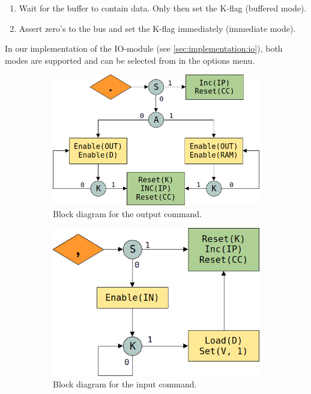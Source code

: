 \begin{enumerate}
\item Wait for the buffer to contain data. Only then set the K-flag (buffered mode).
\item Assert zero's to the bus and set the K-flag immediately (immediate mode).
\end{enumerate}
In our implementation of the IO-module (see \ref{sec:implementation:io}), both modes are supported and can be selected from in the options menu.

\begin{figure}[h]
  \centering
  \mbox{}\hfill
  \begin{subfigure}[t]{0.4\linewidth}
    \centering
    \includegraphics[scale=0.3]{img/outputalg}
    \caption{Block diagram for the output command.}
    \label{fig:inputbufalg}
  \end{subfigure}
  \hfill
  \begin{subfigure}[t]{0.4\linewidth}
    \centering
    \includegraphics[scale=0.3]{img/inputalg}
    \caption{Block diagram for the input command.}
    \label{fig:inputimalg}
  \end{subfigure}
  \hfill\mbox{}
  \caption{}
  \label{fig:inputalg}
\end{figure}

